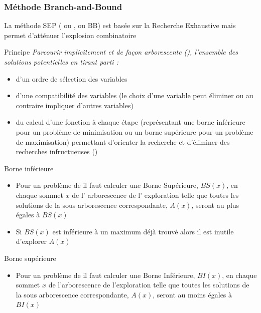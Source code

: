 \documentclass[aspectratio=1610,francais,envcountsect]{beamer}
\begin{document}
\begin{frame}[allowframebreaks]
  \frametitle{Méthode Branch-and-Bound}

  La méthode SEP ( ou
  , ou BB) est basée sur la
  Recherche Exhaustive mais permet d'atténuer l'explosion combinatoire
  \bigskip
  
  \begin{alertblock}{Principe}
    \it Parcourir implicitement et de façon arborescente
    (), l'ensemble des solutions potentielles en
    tirant parti :
  
    \begin{itemize}
    \item d'un ordre de sélection des variables
    \item d'une compatibilité des variables (le choix d'une variable
      peut éliminer ou au contraire impliquer d'autres variables)
    \item du calcul d'une fonction à chaque étape (représentant une
      borne inférieure pour un problème de minimisation ou un borne
      supérieure pour un problème de maximisation) permettant
      d'orienter la recherche et d'éliminer des recherches
      infructueuses ()
    \end{itemize}
  \end{alertblock}
  \framebreak

  \begin{block}{Borne inférieure}
    \begin{itemize}
    \item Pour un problème de  il faut
      calculer une Borne Supérieure, $BS(x)$, en chaque sommet $x$ de
      l' arborescence de l' exploration telle que toutes les solutions
      de la sous arborescence correspondante, $A(x)$, seront au plus
      égales à $BS(x)$
  
  
    \item Si $BS(x)$ est inférieure à un maximum déjà trouvé alors il
      est inutile d'explorer $A(x)$
    \end{itemize}

  \end{block}


  \begin{block}{Borne supérieure}
    \begin{itemize}
    \item Pour un problème de  il faut
      calculer une Borne Inférieure, $BI(x)$, en chaque sommet $x$ de
      l'arborescence de l'exploration telle que toutes les solutions
      de la sous arborescence correspondante, $A(x)$, seront au moins
      égales à $BI(x)$
  

\end{itemize}
\end{block}
\end{frame}
\end{document}
